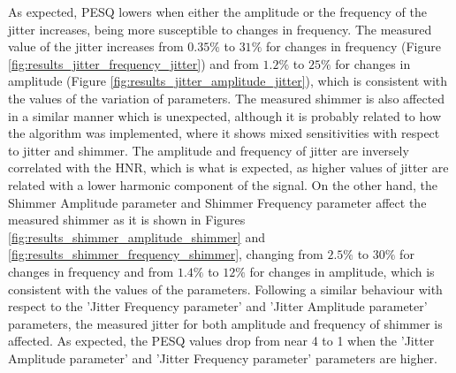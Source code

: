 \documentclass[final,5p,times,twocolumn]{elsarticle}
\begin{document}
As expected, PESQ lowers when either the amplitude or the frequency of the jitter increases, being more susceptible to changes in frequency. The measured value of the jitter increases from $0.35\%$ to $31\%$ for changes in frequency (Figure \ref{fig:results_jitter_frequency_jitter}) and from $1.2\%$ to $25\%$ for changes in amplitude (Figure \ref{fig:results_jitter_amplitude_jitter}), which is consistent with the values of the variation of parameters. The measured shimmer is also affected in a similar manner which is unexpected, although it is probably related to how the algorithm was implemented, where it shows mixed sensitivities with respect to jitter and shimmer. The amplitude and frequency of jitter are inversely correlated with the HNR, which is what is expected, as higher values of jitter are related with a lower harmonic component of the signal. On the other hand, the Shimmer Amplitude parameter and Shimmer Frequency parameter affect the measured shimmer as it is shown in Figures \ref{fig:results_shimmer_amplitude_shimmer} and \ref{fig:results_shimmer_frequency_shimmer}, changing from $2.5\%$ to $30\%$ for changes in frequency and from $1.4\%$ to $12\%$ for changes in amplitude, which is consistent with the values of the parameters. Following a similar behaviour with respect to the 'Jitter Frequency parameter' and 'Jitter Amplitude parameter' parameters, the measured jitter for both amplitude and frequency of shimmer is affected. As expected, the PESQ values drop from near 4 to 1 when the 'Jitter Amplitude parameter' and 'Jitter Frequency parameter' parameters are higher.
\end{document}
